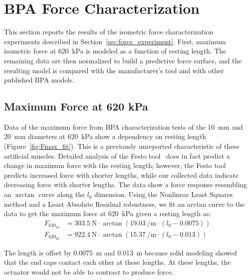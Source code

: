 \section{BPA Force Characterization}\label{sec:results_force}

This section reports the results of the isometric force characterization experiments described in Section~\ref{sec:force_experiment}. First, maximum isometric force at \qty{620}{\kPa} is modeled as a function of resting length. The remaining data are then normalized to build a predictive force surface, and the resulting model is compared with the manufacturer's tool and with other published BPA models.


\subsection{Maximum Force at 620 kPa}

Data of the maximum force from BPA characterization tests of the \qty{10}{\mm} and \qty{20}{\mm} diameters at \qty{620}{\kPa} show a dependency on resting length (Figure~\ref{fig:Fmax_fit}). This is a previously unreported characteristic of these artificial muscles. Detailed analysis of the Festo \mbox{tool \citep{festo_2026}} does in fact predict a change in maximum force with the resting length; however, the Festo tool predicts increased force with shorter lengths, while our collected data indicate decreasing force with shorter lengths. The data show a force response resembling an $\arctan$ curve along the $l_0$ dimension. Using the Nonlinear Least Squares method and a Least Absolute Residual robustness, we fit an arctan curve to the data to get the maximum force at \qty{620}{\kPa} given a resting length as:
\begin{align}
    F_{620_{10}} &= \qty{303.5}{\N}\cdot \arctan{( \qty{19.03}{\per\metre} \cdot (l_0-0.0075))}  \label{eq:Fmax10} \\[10pt]
    F_{620_{20}} &= \qty{922.4}{\N} \cdot \arctan{(\qty{15.37}{\per\m} \cdot (l_0-0.013))} \label{eq:Fmax20}
\end{align}

\noindent
The length is offset by \qty{0.0075}{\m} and \qty{0.013}{\m} because solid modeling showed that the end caps contact each other at these lengths. At these lengths, the actuator would not be able to contract to produce force.


